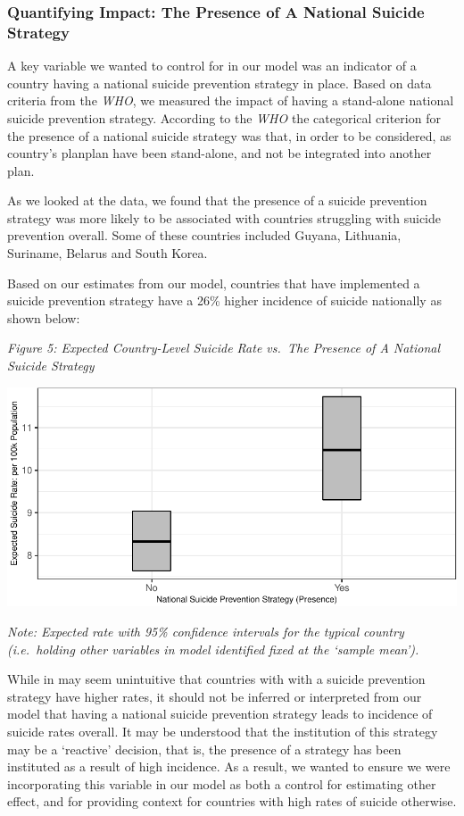\documentclass[]{article}
\begin{document}
\subsubsection{Quantifying Impact: The Presence of A National Suicide
Strategy}\label{quantifying-impact-the-presence-of-a-national-suicide-strategy}

A key variable we wanted to control for in our model was an indicator of
a country having a national suicide prevention strategy in place. Based
on data criteria from the \emph{WHO}, we measured the impact of having a
stand-alone national suicide prevention strategy. According to the
\emph{WHO} the categorical criterion for the presence of a national
suicide strategy was that, in order to be considered, as country's
planplan have been stand-alone, and not be integrated into another plan.

As we looked at the data, we found that the presence of a suicide
prevention strategy was more likely to be associated with countries
struggling with suicide prevention overall. Some of these countries
included Guyana, Lithuania, Suriname, Belarus and South Korea.

Based on our estimates from our model, countries that have implemented a
suicide prevention strategy have a 26\% higher incidence of suicide
nationally as shown below:

\emph{Figure 5: Expected Country-Level Suicide Rate vs.~The Presence of
A National Suicide Strategy}

\begin{center}\includegraphics{Project_Report_files/figure-latex/sstrat_plot-1} \end{center}

\emph{Note: Expected rate with 95\% confidence intervals for the typical
country (i.e.~holding other variables in model identified fixed at the
`sample mean').}

While in may seem unintuitive that countries with with a suicide
prevention strategy have higher rates, it should not be inferred or
interpreted from our model that having a national suicide prevention
strategy leads to incidence of suicide rates overall. It may be
understood that the institution of this strategy may be a `reactive'
decision, that is, the presence of a strategy has been instituted as a
result of high incidence. As a result, we wanted to ensure we were
incorporating this variable in our model as both a control for
estimating other effect, and for providing context for countries with
high rates of suicide otherwise.
\end{document}
